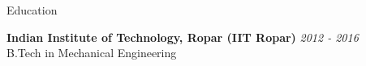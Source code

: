 \documentclass[
	a4paper, %
	12pt, %
]{resume} %
\begin{document}

\begin{rSection}{Education}
	
	\textbf{Indian Institute of Technology, Ropar (IIT Ropar)} \hfill \textit{2012 - 2016} \\ 
	B.Tech in Mechanical Engineering \\
\end{rSection}
\end{document}
